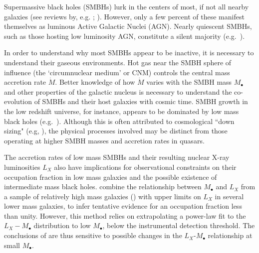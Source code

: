 \documentclass[usenatbib,fleqn]{mn2e}
\newcommand{\Mbh}[1][]{M_{\bullet#1}}
\begin{document}
Supermassive black holes (SMBHs) lurk in the centers of most, if not
all nearby galaxies (see reviews by,
e.g. \citealt{KormendyRichstone:1995a};
\citealt{FerrareseFord:2005a}). However, only a few percent of these
manifest themselves as luminous Active Galactic Nuclei (AGN).  Nearly
quiescent SMBHs, such as those hosting low luminosity AGN, constitute
a silent majority (e.g.~\citealt{Ho:2009a}).

In order to understand why most SMBHs appear to be inactive, it is
necessary to understand their gaseous environments.  Hot gas near the
SMBH sphere of influence (the `circumnuclear medium' or CNM) controls
the central mass accretion rate $\dot{M}$.  Better knowledge of how
$\dot{M}$ varies with the SMBH mass $\Mbh$ and other properties of the
galactic nucleus is necessary to understand the co-evolution of SMBHs
and their host galaxies with cosmic time.  SMBH growth in the low
redshift universe, for instance, appears to be dominated by low mass
black holes (e.g.~\citealt{Heckman+04}).  Although this is often
attributed to cosmological ``down sizing" (e.g, \citealt{Gallo+08}),
the physical processes involved may be distinct from those operating
at higher SMBH masses and accretion rates in quasars.

The accretion rates of low mass SMBHs and their resulting nuclear
X-ray luminosities $L_X$ also have implications for observational
constraints on their occupation fraction in low mass galaxies and the
possible existence of intermediate mass black holes.
\citet{MillerGallo+:2014a} combine the relationship between $\Mbh$ and
$L_X$ from a sample of relatively high mass galaxies
(\citealt{Gallo+08}) with upper limits on $L_X$ in several lower mass
galaxies, to infer tentative evidence for an occupation fraction less
than unity.  However, this method relies on extrapolating a power-law
fit to the $L_X-\Mbh$ distribution to low $\Mbh$, below the
instrumental detection threshold.  The conclusions of
\citet{MillerGallo+:2014a} are thus sensitive to possible changes in
the $L_X$-$\Mbh$ relationship at small $\Mbh$.
\end{document}
